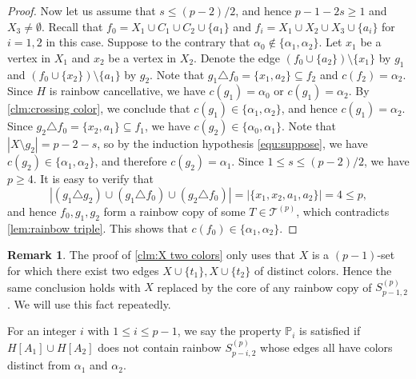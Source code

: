 \documentclass[10pt,a4paper]{article}
\theoremstyle{definition}
\newtheorem{remark}[theorem]{Remark}
\newcommand{\PP}{\mathbb{P}}
\newcommand{\cT}{\mathcal{T}}
\begin{document}
\begin{proof}
    Now let us assume that $s\le (p-2)/2$, and hence $p-1-2s\ge1$ and $X_3\ne\emptyset$.
    Recall that $f_0=X_1\cup C_1\cup C_2\cup\{a_1\}$ and $f_i=X_1\cup X_2\cup X_3\cup\{a_i\}$ for $i=1,2$ in this case.
    Suppose to the contrary that $\alpha_0\notin\{\alpha_1,\alpha_2\}$.
    Let $x_1$ be a vertex in $X_1$ and $x_2$ be a vertex in $X_2$.
    Denote the edge $(f_0\cup\{a_2\})\setminus\{x_1\}$ by $g_1$
    and $(f_0\cup\{x_2\})\setminus\{a_1\}$ by $g_2$.
    Note that $g_1\triangle f_0=\{x_1,a_2\}\subseteq f_2$ and $c(f_2)=\alpha_2$.
    Since $H$ is rainbow cancellative, we have $c(g_1)=\alpha_0$ or $c(g_1)=\alpha_2$.
    By \cref{clm:crossing color}, we conclude that $c(g_1)\in\{\alpha_1,\alpha_2\}$, and hence $c(g_1)=\alpha_2$.
    Since $g_2\triangle f_0=\{x_2,a_1\}\subseteq f_1$, we have $c(g_2)\in\{\alpha_0,\alpha_1\}$.
    Note that $|X\setminus g_2|=p-2-s$, so by the induction hypothesis \eqref{equ:suppose}, we have $c(g_2)\in\{\alpha_1,\alpha_2\}$, and therefore $c(g_2)=\alpha_1$.
    Since $1\le s\le (p-2)/2$, we have $p\ge4$.
    It is easy to verify that
    \[
        |(g_1\triangle g_2) \cup (g_1\triangle f_0) \cup (g_2 \triangle f_0)| = |\{x_1,x_2,a_1,a_2\}| = 4 \le p,
    \]
    and hence $f_0,g_1,g_2$ form a rainbow copy of some $T\in \cT^{(p)}$, which contradicts \cref{lem:rainbow triple}.
    This shows that $c(f_0)\in\{\alpha_1,\alpha_2\}$.
\end{proof}

\begin{remark}\label{rem:core-two-colors}
    The proof of \cref{clm:X two colors} only uses that $X$ is a $(p-1)$-set for which there exist
    two edges $X\cup\{t_1\},X\cup\{t_2\}$ of distinct colors.
    Hence the same conclusion holds with $X$ replaced by the core of any rainbow copy of $S_{p-1,2}^{(p)}$.
    We will use this fact repeatedly.
\end{remark}
For an integer $i$ with $1\le i\le p-1$, we say the property $\PP_i$ is satisfied if $H[A_1]\cup H[A_2]$ does not contain rainbow $S^{(p)}_{p-i,2}$ whose edges all have colors distinct from $\alpha_1$ and $\alpha_2$.
\end{document}
